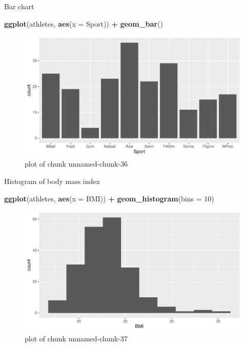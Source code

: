 \documentclass[ignorenonframetext,]{beamer}
\newenvironment{Shaded}{\begin{snugshade}}{\end{snugshade}}
\newcommand{\DataTypeTok}[1]{\textcolor[rgb]{0.13,0.29,0.53}{#1}}
\newcommand{\DecValTok}[1]{\textcolor[rgb]{0.00,0.00,0.81}{#1}}
\newcommand{\KeywordTok}[1]{\textcolor[rgb]{0.13,0.29,0.53}{\textbf{#1}}}
\newcommand{\NormalTok}[1]{#1}
\newcommand{\OperatorTok}[1]{\textcolor[rgb]{0.81,0.36,0.00}{\textbf{#1}}}
\newcommand{\StringTok}[1]{\textcolor[rgb]{0.31,0.60,0.02}{#1}}
\begin{document}
\begin{frame}[fragile]{Bar chart}
\protect\hypertarget{bar-chart}{}

\begin{Shaded}
\begin{Highlighting}[]
\KeywordTok{ggplot}\NormalTok{(athletes, }\KeywordTok{aes}\NormalTok{(}\DataTypeTok{x =}\NormalTok{ Sport)) }\OperatorTok{+}\StringTok{ }\KeywordTok{geom_bar}\NormalTok{()}
\end{Highlighting}
\end{Shaded}

\begin{figure}
\centering
\includegraphics{figure/unnamed-chunk-36-1.pdf}
\caption{plot of chunk unnamed-chunk-36}
\end{figure}

\end{frame}

\begin{frame}[fragile]{Histogram of body mass index}
\protect\hypertarget{histogram-of-body-mass-index}{}

\begin{Shaded}
\begin{Highlighting}[]
\KeywordTok{ggplot}\NormalTok{(athletes, }\KeywordTok{aes}\NormalTok{(}\DataTypeTok{x =}\NormalTok{ BMI)) }\OperatorTok{+}\StringTok{ }\KeywordTok{geom_histogram}\NormalTok{(}\DataTypeTok{bins =} \DecValTok{10}\NormalTok{)}
\end{Highlighting}
\end{Shaded}

\begin{figure}
\centering
\includegraphics{figure/unnamed-chunk-37-1.pdf}
\caption{plot of chunk unnamed-chunk-37}
\end{figure}

\end{frame}
\end{document}
